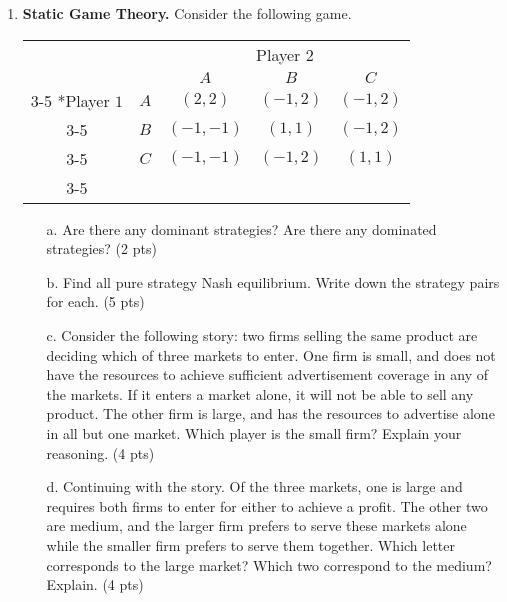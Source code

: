 \documentclass{article}
\begin{document}
\begin{enumerate}
   \item \textbf{Static Game Theory.} Consider the following game.
    
    \begin{table}[H]
    \begin{tabular}{cc|c|c|c|}
      & \multicolumn{1}{c}{} & \multicolumn{3}{c}{Player $2$}\\
      & \multicolumn{1}{c}{} & \multicolumn{1}{c}{$A$}  & \multicolumn{1}{c}{$B$} & \multicolumn{1}{c}{$C$}\\\cline{3-5}
      \multirow{3}*{Player $1$}  & $A$ & $(2,2)$ & $(-1,2)$  & $(-1,2)$ \\\cline{3-5}
      & $B$ & $(-1,-1)$ & $(1,1)$ & $(-1,2)$ \\\cline{3-5}
      & $C$ & $(-1,-1)$ & $(-1,2)$ & $(1,1)$ \\\cline{3-5}
    \end{tabular}
      \end{table}
      \begin{enumerate}
          \item[a.] Are there any dominant strategies? Are there any dominated strategies? (2 pts)
          
          \vspace{4cm}
          
          
          \item[b.] Find all pure strategy Nash equilibrium. Write down the strategy pairs for each. (5 pts)
          
          \vspace{4cm}
          
          
          \item[c.] Consider the following story: two firms selling the same product are deciding which of three markets to enter. One firm is small, and does not have the resources to achieve sufficient advertisement coverage in any of the markets. If it enters a market alone, it will not be able to sell any product. The other firm is large, and has the resources to advertise alone in all but one market. Which player is the small firm? Explain your reasoning. (4 pts)
          
          \vspace{4cm}
          
          
          \item[d.] Continuing with the story. Of the three markets, one is large and requires both firms to enter for either to achieve a profit. The other two are medium, and the larger firm prefers to serve these markets alone while the smaller firm prefers to serve them together. Which letter corresponds to the large market? Which two correspond to the medium? Explain. (4 pts)
          

\end{enumerate}
\end{enumerate}
\end{document}
